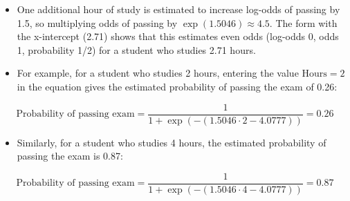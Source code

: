 \documentclass[11pt,dvipsnames,ignorenonframetext,aspectratio=169]{beamer}
\providecommand{\tightlist}{%
  \setlength{\itemsep}{0pt}\setlength{\parskip}{0pt}}
\begin{document}
\begin{frame}{}
\protect\hypertarget{section-9}{}

\begin{itemize}
\item
  One additional hour of study is estimated to increase log-odds of
  passing by 1.5, so multiplying odds of passing by
  \({\displaystyle \exp(1.5046)\approx 4.5.}\) The form with the
  x-intercept (2.71) shows that this estimates even odds (log-odds 0,
  odds 1, probability 1/2) for a student who studies 2.71 hours.
\item
  For example, for a student who studies 2 hours, entering the value
  \({\displaystyle {\text{Hours}}=2}\) in the equation gives the
  estimated probability of passing the exam of 0.26:
\end{itemize}

\[{\displaystyle {\text{Probability of passing exam}}={\frac {1}{1+\exp \left(-\left(1.5046\cdot 2-4.0777\right)\right)}}=0.26}\]

\begin{itemize}
\tightlist
\item
  Similarly, for a student who studies 4 hours, the estimated
  probability of passing the exam is 0.87:
\end{itemize}

\[{\displaystyle {\text{Probability of passing exam}}={\frac {1}{1+\exp \left(-\left(1.5046\cdot 4-4.0777\right)\right)}}=0.87}\]

\end{frame}
\end{document}
